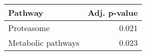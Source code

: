 \begin{tabular}{lr}
\toprule
            Pathway &  Adj. p-value \\
\midrule
         Proteasome &         0.021 \\
 Metabolic pathways &         0.023 \\
\bottomrule
\end{tabular}
